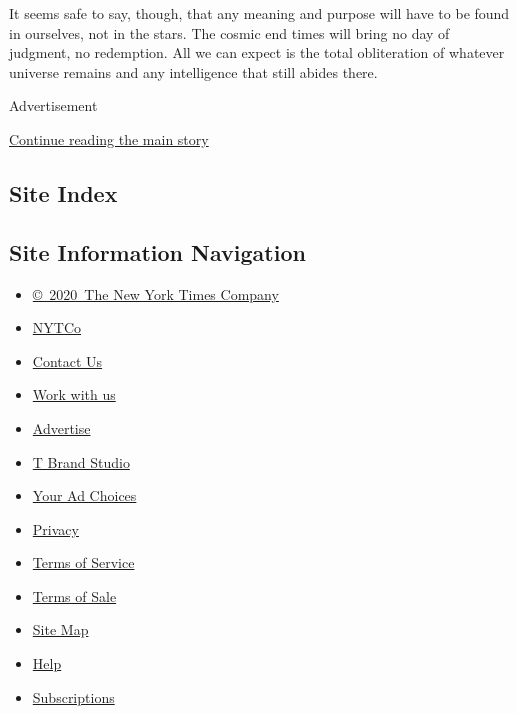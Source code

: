 It seems safe to say, though, that any meaning and purpose will have to
be found in ourselves, not in the stars. The cosmic end times will bring
no day of judgment, no redemption. All we can expect is the total
obliteration of whatever universe remains and any intelligence that
still abides there.

Advertisement

\protect\hyperlink{after-bottom}{Continue reading the main story}

\hypertarget{site-index}{%
\subsection{Site Index}\label{site-index}}

\hypertarget{site-information-navigation}{%
\subsection{Site Information
Navigation}\label{site-information-navigation}}

\begin{itemize}
\tightlist
\item
  \href{https://help.nytimes3xbfgragh.onion/hc/en-us/articles/115014792127-Copyright-notice}{©~2020~The
  New York Times Company}
\end{itemize}

\begin{itemize}
\tightlist
\item
  \href{https://www.nytco.com/}{NYTCo}
\item
  \href{https://help.nytimes3xbfgragh.onion/hc/en-us/articles/115015385887-Contact-Us}{Contact
  Us}
\item
  \href{https://www.nytco.com/careers/}{Work with us}
\item
  \href{https://nytmediakit.com/}{Advertise}
\item
  \href{http://www.tbrandstudio.com/}{T Brand Studio}
\item
  \href{https://www.nytimes3xbfgragh.onion/privacy/cookie-policy\#how-do-i-manage-trackers}{Your
  Ad Choices}
\item
  \href{https://www.nytimes3xbfgragh.onion/privacy}{Privacy}
\item
  \href{https://help.nytimes3xbfgragh.onion/hc/en-us/articles/115014893428-Terms-of-service}{Terms
  of Service}
\item
  \href{https://help.nytimes3xbfgragh.onion/hc/en-us/articles/115014893968-Terms-of-sale}{Terms
  of Sale}
\item
  \href{https://spiderbites.nytimes3xbfgragh.onion}{Site Map}
\item
  \href{https://help.nytimes3xbfgragh.onion/hc/en-us}{Help}
\item
  \href{https://www.nytimes3xbfgragh.onion/subscription?campaignId=37WXW}{Subscriptions}
\end{itemize}
